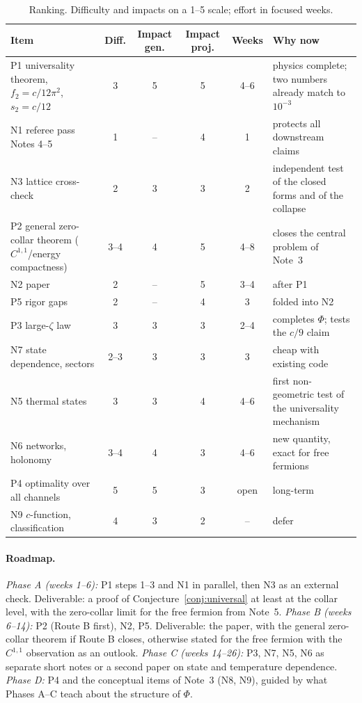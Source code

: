 \documentclass[11pt]{article}
\theoremstyle{accent}
\theoremstyle{definition}
\begin{document}
\begin{table}[ht]\centering\small
\caption{Ranking. Difficulty and impacts on a 1--5 scale; effort in focused weeks.}\label{tab:rank}
\begin{tabularx}{\textwidth}{>{\raggedright\arraybackslash}p{} c c c c >{\raggedright\arraybackslash}X}\toprule
Item & Diff. & Impact gen. & Impact proj. & Weeks & Why now \\\midrule
P1 universality theorem, \(f_2=c/12\pi^2\), \(s_2=c/12\) & 3 & 5 & 5 & 4--6 & physics complete; two numbers already match to \(10^{-3}\) \\
N1 referee pass Notes 4--5 & 1 & -- & 4 & 1 & protects all downstream claims \\
N3 lattice cross-check & 2 & 3 & 3 & 2 & independent test of the closed forms and of the collapse \\
P2 general zero-collar theorem (\(C^{1,1}\)/energy compactness) & 3--4 & 4 & 5 & 4--8 & closes the central problem of Note~3 \\
N2 paper & 2 & -- & 5 & 3--4 & after P1 \\
P5 rigor gaps & 2 & -- & 4 & 3 & folded into N2 \\
P3 large-\(\zeta\) law & 3 & 3 & 3 & 2--4 & completes \(\Phi\); tests the \(c/9\) claim \\
N7 state dependence, sectors & 2--3 & 3 & 3 & 3 & cheap with existing code \\
N5 thermal states & 3 & 3 & 4 & 4--6 & first non-geometric test of the universality mechanism \\
N6 networks, holonomy & 3--4 & 4 & 3 & 4--6 & new quantity, exact for free fermions \\
P4 optimality over all channels & 5 & 5 & 3 & open & long-term \\
N9 \(c\)-function, classification & 4 & 3 & 2 & -- & defer \\
\bottomrule
\end{tabularx}
\end{table}

\paragraph{Roadmap.}
\emph{Phase A (weeks 1--6):} P1 steps 1--3 and N1 in parallel, then N3 as an external check.  Deliverable: a proof of Conjecture~\ref{conj:universal} at least at the collar level, with the zero-collar limit for the free fermion from Note~5.
\emph{Phase B (weeks 6--14):} P2 (Route B first), N2, P5.  Deliverable: the paper, with the general zero-collar theorem if Route B closes, otherwise stated for the free fermion with the \(C^{1,1}\) observation as an outlook.
\emph{Phase C (weeks 14--26):} P3, N7, N5, N6 as separate short notes or a second paper on state and temperature dependence.
\emph{Phase D:} P4 and the conceptual items of Note~3 (N8, N9), guided by what Phases A--C teach about the structure of \(\Phi\).
\end{document}
